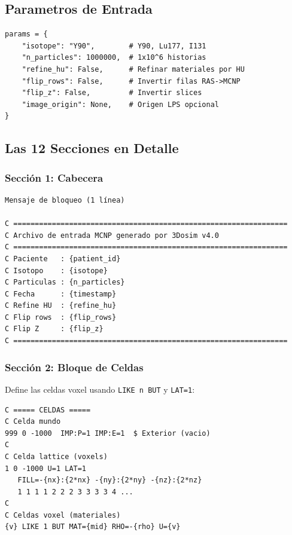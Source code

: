 \documentclass[12pt,a4paper]{article}
\begin{document}
\subsection{Parametros de Entrada}

\begin{lstlisting}
params = {
    "isotope": "Y90",        # Y90, Lu177, I131
    "n_particles": 1000000,  # 1x10^6 historias
    "refine_hu": False,      # Refinar materiales por HU
    "flip_rows": False,      # Invertir filas RAS->MCNP
    "flip_z": False,         # Invertir slices
    "image_origin": None,    # Origen LPS opcional
}
\end{lstlisting}

\subsection{Las 12 Secciones en Detalle}

\subsubsection{Sección 1: Cabecera}

\begin{lstlisting}
Mensaje de bloqueo (1 línea)

C ================================================================
C Archivo de entrada MCNP generado por 3Dosim v4.0
C ================================================================
C Paciente   : {patient_id}
C Isotopo    : {isotope}
C Particulas : {n_particles}
C Fecha      : {timestamp}
C Refine HU  : {refine_hu}
C Flip rows  : {flip_rows}
C Flip Z     : {flip_z}
C ================================================================
\end{lstlisting}

\subsubsection{Sección 2: Bloque de Celdas}

Define las celdas voxel usando \texttt{LIKE n BUT} y \texttt{LAT=1}:

\begin{lstlisting}
C ===== CELDAS =====
C Celda mundo
999 0 -1000  IMP:P=1 IMP:E=1  $ Exterior (vacio)
C
C Celda lattice (voxels)
1 0 -1000 U=1 LAT=1
   FILL=-{nx}:{2*nx} -{ny}:{2*ny} -{nz}:{2*nz}
   1 1 1 1 2 2 2 3 3 3 3 4 ...
C
C Celdas voxel (materiales)
{v} LIKE 1 BUT MAT={mid} RHO=-{rho} U={v}
\end{lstlisting}
\end{document}
